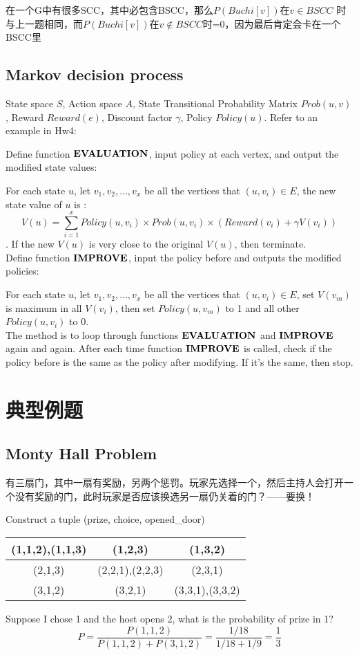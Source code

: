 \documentclass[12pt,a4paper]{ctexrep}
\begin{document}
在一个G中有很多SCC，其中必包含BSCC，那么$P(Buchi[v])$在$v\in BSCC$ 时与上一题相同，而$P(Buchi[v])$在$v \notin BSCC$时=0，因为最后肯定会卡在一个BSCC里

\subsection{Markov decision process}
State space $S$, Action space $A$, State Transitional Probability Matrix $Prob(u,v)$, Reward $Reward(e)$, Discount factor $\gamma$, Policy $Policy(u)$. Refer to an example in Hw4: 

Define function $\bold{EVALUATION}$, input policy at each vertex, and output the modified state values:

For each state $u$, let $v_1,v_2,\dots, v_x$ be all the vertices that $(u,v_i)\in E$, the new state value of $u$ is :\[V(u)=\sum_{i=1}^{x} Policy(u,v_i)\times Prob(u,v_i)\times (Reward(v_i)+\gamma V(v_i))\]. If the new $V(u)$ is very close to the original $V(u)$, then terminate.\\

Define function $\bold{IMPROVE}$, input the policy before and outputs the modified policies:

For each state $u$, let $v_1,v_2,\dots, v_x$ be all the vertices that $(u,v_i)\in E$, set $V(v_m)$ is maximum in all $V(v_i)$, then set $Policy(u,v_m)$ to 1 and all other $Policy(u,v_i)$ to 0. \\

The method is to loop through functions $\bold{EVALUATION}$ and $\bold{IMPROVE}$ again and again. After each time function $\bold{IMPROVE}$ is called, check if the policy before is the same as the policy after modifying. If it's the same, then stop.
\section{典型例题}
\subsection{Monty Hall Problem}
有三扇门，其中一扇有奖励，另两个惩罚。玩家先选择一个，然后主持人会打开一个没有奖励的门，此时玩家是否应该换选另一扇仍关着的门？——要换！

Construct a tuple (prize, choice, opened\_door)
\begin{center}
\begin{tabular}{|c|c|c|}
\hline
(1,1,2),(1,1,3) & (1,2,3) & (1,3,2)\\
\hline
(2,1,3) & (2,2,1),(2,2,3) & (2,3,1)\\
\hline
(3,1,2) & (3,2,1) & (3,3,1),(3,3,2)\\
\hline
\end{tabular}
\end{center}
Suppose I chose 1 and the host opens 2, what is the probability of prize in 1? \[P = \frac{P(1,1,2)}{P(1,1,2)+P(3,1,2)} = \frac{1/18}{1/18+1/9} = \frac{1}{3}\]
\end{document}
